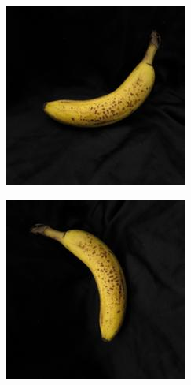 \documentclass{article} %
\begin{document}
\begin{figure}[h]
\begin{subfigure}{.123\textwidth}
\end{subfigure}\, %
  \begin{subfigure}{.123\textwidth}
  \centering
\includegraphics[width=\textwidth]{2_1.jpg}
\end{subfigure}%
 \begin{subfigure}{.123\textwidth}
  \centering
\includegraphics[width=\textwidth]{2_2.jpg}

\end{subfigure}
\end{figure}
\end{document}
